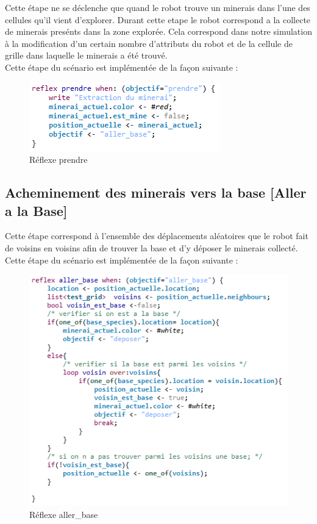 Cette étape ne se déclenche que quand le robot trouve un minerais dans l'une des cellules qu'il vient d'explorer. Durant cette etape le robot correspond a la collecte de minerais presénts dans la zone explorée. Cela correspond dans notre simulation à la modification d'un certain nombre d'attributs du robot et de la cellule de grille dans laquelle le minerais a été trouvé.\\
\newpage
Cette étape du scénario est implémentée de la façon suivante : 
\begin{figure}[!h]
	\begin{center}
		\includegraphics{code/prendre}
	\end{center}
	\caption{Réflexe prendre}
\end{figure}

\subsection{Acheminement des minerais vers la base [Aller a la Base]}

Cette étape correspond à l'ensemble des déplacements aléatoires que le robot fait de voisins en voisins afin de trouver la base et d'y déposer le minerais collecté.\\ 
Cette étape du scénario est implémentée de la façon suivante : 
\begin{figure}[!h]
	\begin{center}
		\includegraphics{code/aller_base_reactif}
	\end{center}
	\caption{Réflexe aller\_base}
\end{figure}


